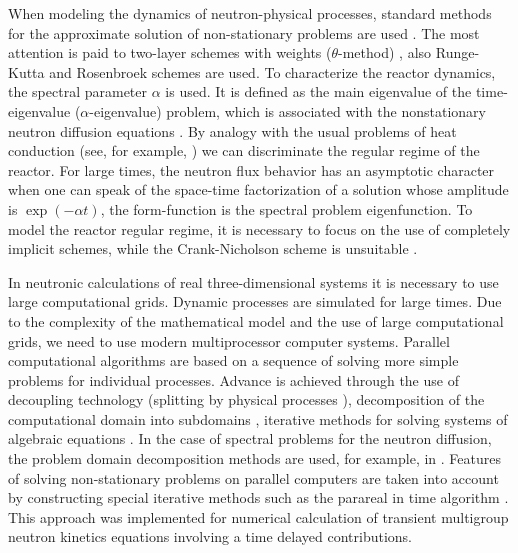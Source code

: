 \documentclass[authoryear]{elsarticle}
\begin{document}
When modeling the dynamics of neutron-physical processes, standard methods for the approximate solution of non-stationary problems are used  \citep{sutton1996diffusion,cho2005fundamentals,stacey}. The most attention is paid to two-layer schemes with weights ($\theta$-method) \citep{Ascher2008,LeVeque2007,HundsdorferVerwer2003},
also Runge-Kutta and Rosenbroek schemes \citep{Butcher2008,HairerWanner2010}are used. To characterize the reactor dynamics, the spectral parameter  $\alpha$ is used. It is defined as the main eigenvalue of the time-eigenvalue  ($\alpha$-eigenvalue) problem, which is associated with the nonstationary neutron diffusion equations 
\citep{Bell1970,modak2007scheme,verdu20103d}.
By analogy with the usual problems of heat conduction (see, for example,  \cite{luikov2012analytical,samarskii1996computational}) we can discriminate the regular regime of the reactor. For large times, the neutron flux behavior has an asymptotic character when one can speak of the space-time factorization of a solution whose amplitude is $\exp(-\alpha t)$, the form-function is the spectral problem eigenfunction. To model the reactor regular regime, it is necessary to focus on the use of completely implicit schemes, while the Crank-Nicholson scheme is unsuitable  \citep{nd-mm}.

In neutronic calculations of real three-dimensional systems it is necessary to use large computational grids. Dynamic processes are simulated for large times. Due to the complexity of the mathematical model and the use of large computational grids, we need to use modern multiprocessor computer systems. Parallel computational algorithms are based on a sequence of solving more simple problems for individual processes. Advance is achieved through the use of decoupling technology (splitting by physical processes 
\citep{Vabishchevich2014}), decomposition of the computational domain into subdomains  \citep{ToselliWidlund2005},
iterative methods for solving systems of algebraic equations  \citep{Saad2003}. 
In the case of spectral problems for the neutron diffusion, the problem domain decomposition methods are used, for example, in  \cite{guerin2010domain}. 
Features of solving non-stationary problems on parallel computers are taken into account by constructing special iterative methods such as the parareal in time algorithm  \citep{maday2005parareal}. 
This approach was implemented \cite{baudron2014parareal} for numerical calculation of transient multigroup neutron kinetics equations involving a time delayed contributions.
\end{document}
